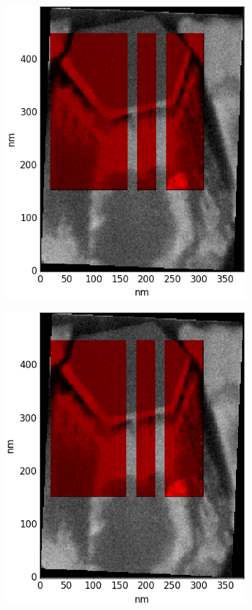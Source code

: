 \begin{figure}
	\centering
	\begin{subfigure}{0.33\textwidth}
		\includegraphics[width=\textwidth]{fig/other/edxinsped/orig5-2}
		\caption{}
		\label{fig:edxspedorig}
	\end{subfigure}%
	\hfill
	\begin{subfigure}{0.33\textwidth}
		\includegraphics[width=\textwidth]{fig/other/edxinsped/rot5-2}

\end{subfigure}
\end{figure}

